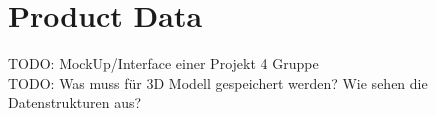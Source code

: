 \section{Product Data}

TODO: MockUp/Interface einer Projekt 4 Gruppe \\
TODO: Was muss für 3D Modell gespeichert werden? Wie sehen die Datenstrukturen aus? \\


